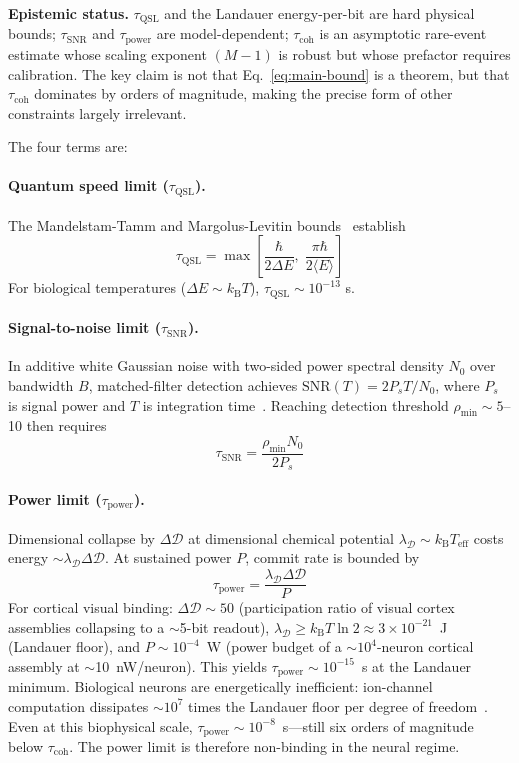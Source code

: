 \documentclass[12pt]{article}
\newcommand{\kB}{k_{\mathrm{B}}}
\newcommand{\Teff}{T_{\mathrm{eff}}}
\begin{document}
\textbf{Epistemic status.} $\tau_{\mathrm{QSL}}$ and the Landauer energy-per-bit are hard physical bounds; $\tau_{\mathrm{SNR}}$ and $\tau_{\mathrm{power}}$ are model-dependent; $\tau_{\mathrm{coh}}$ is an asymptotic rare-event estimate whose scaling exponent $(M-1)$ is robust but whose prefactor requires calibration. The key claim is not that Eq.~\ref{eq:main-bound} is a theorem, but that $\tau_{\mathrm{coh}}$ dominates by orders of magnitude, making the precise form of other constraints largely irrelevant.

The four terms are:

\paragraph{Quantum speed limit ($\tau_{\mathrm{QSL}}$).} The Mandelstam-Tamm and Margolus-Levitin bounds~\cite{mandelstam1945,margolus1998} establish
\[
\tau_{\mathrm{QSL}} = \max\left[\frac{\hbar}{2\Delta E},\; \frac{\pi\hbar}{2\langle E\rangle}\right]
\]
For biological temperatures ($\Delta E \sim \kB T$), $\tau_{\mathrm{QSL}} \sim 10^{-13}$ s.

\paragraph{Signal-to-noise limit ($\tau_{\mathrm{SNR}}$).} In additive white Gaussian noise with two-sided power spectral density $N_0$ over bandwidth $B$, matched-filter detection achieves $\mathrm{SNR}(T) = 2P_s T/N_0$, where $P_s$ is signal power and $T$ is integration time~\cite{poor1994}. Reaching detection threshold $\rho_{\min} \sim 5$--10 then requires
\[
\tau_{\mathrm{SNR}} = \frac{\rho_{\min} N_0}{2P_s}
\]

\paragraph{Power limit ($\tau_{\mathrm{power}}$).} Dimensional collapse by $\Delta\mathcal{D}$ at dimensional chemical potential $\lambda_{\mathcal{D}} \sim \kB\Teff$ costs energy $\sim \lambda_{\mathcal{D}}\Delta\mathcal{D}$. At sustained power $P$, commit rate is bounded by
\[
\tau_{\mathrm{power}} = \frac{\lambda_{\mathcal{D}}\Delta\mathcal{D}}{P}
\]
For cortical visual binding: $\Delta\mathcal{D} \sim 50$ (participation ratio of visual cortex assemblies collapsing to a $\sim$5-bit readout), $\lambda_{\mathcal{D}} \geq \kB T \ln 2 \approx 3 \times 10^{-21}$~J (Landauer floor), and $P \sim 10^{-4}$~W (power budget of a $\sim$$10^4$-neuron cortical assembly at $\sim$10~nW/neuron). This yields $\tau_{\mathrm{power}} \sim 10^{-15}$~s at the Landauer minimum. Biological neurons are energetically inefficient: ion-channel computation dissipates $\sim$$10^7$ times the Landauer floor per degree of freedom~\cite{landauer1961}. Even at this biophysical scale, $\tau_{\mathrm{power}} \sim 10^{-8}$~s---still six orders of magnitude below $\tau_{\mathrm{coh}}$. The power limit is therefore non-binding in the neural regime.
\end{document}
